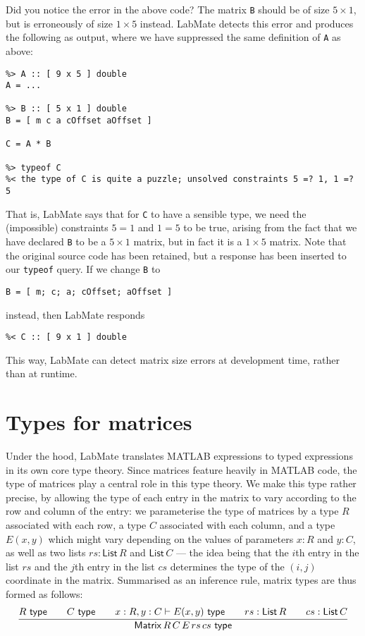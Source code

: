 \documentclass{ws-procs9x6}
\newcommand{\istype}[1]{#1\ \textsf{type}}
\newcommand{\Matrix}[5]{\mathsf{Matrix}\,#1\,#2\,#3\,#4\,#5}
\newcommand{\List}[1]{\mathsf{List}\,#1}
\begin{document}
Did you notice the error in the above code? The matrix \texttt{B} should be of size $5 \times 1$, but is erroneously of size $1 \times 5$ instead. LabMate detects this error and produces the following as output, where we have suppressed the same definition of \texttt{A} as above:
\begin{verbatim}
%> A :: [ 9 x 5 ] double
A = ...

%> B :: [ 5 x 1 ] double
B = [ m c a cOffset aOffset ]

C = A * B

%> typeof C
%< the type of C is quite a puzzle; unsolved constraints 5 =? 1, 1 =? 5
\end{verbatim}
%
That is, LabMate says that for \texttt{C} to have a sensible type, we need the (impossible) constraints $5 = 1$ and $1 = 5$ to be true, arising from the fact that we have declared \texttt{B} to be a $5 \times 1$ matrix, but in fact it is a $1 \times 5$ matrix. Note that the original source code has been retained, but a response has been inserted to our \texttt{typeof} query. If we change \texttt{B} to
\begin{verbatim}
B = [ m; c; a; cOffset; aOffset ]
\end{verbatim}
instead, then LabMate responds
\begin{verbatim}
%< C :: [ 9 x 1 ] double
\end{verbatim}
This way, LabMate can detect matrix size errors at development time, rather than at runtime.

\section{Types for matrices}

Under the hood, LabMate translates MATLAB expressions to typed
expressions in its own core type theory.
%
Since matrices feature heavily in MATLAB code, the type of matrices
play a central role in this type theory.
%
We make this type rather precise, by allowing the type of each entry
in the matrix to vary according to the row and column of the entry:
%
we parameterise the type of matrices by a type $R$ associated with
each row, a type $C$ associated with each column, and a type $E(x,y)$
which might vary depending on the values of parameters $x : R$ and
$y : C$, as well as two lists $rs : \List{R}$ and $\List{C}$ --- the
idea being that the $i$th entry in the list $rs$ and the $j$th entry
in the list $cs$ determines the type of the $(i, j)$ coordinate in the
matrix.
%
Summarised as an inference rule, matrix types are thus formed as follows:
%
\[
  \infer{\istype{\Matrix{R}{C}{E}{rs}{cs}}}
  {
    \istype{R}
    &\quad
    \istype{C}
    &\quad
    x : R, y : C \vdash \istype{E(x,y)}
    &\quad
    rs : \List{R}
    &\quad
    cs : \List{C}
  }
\]
\end{document}
